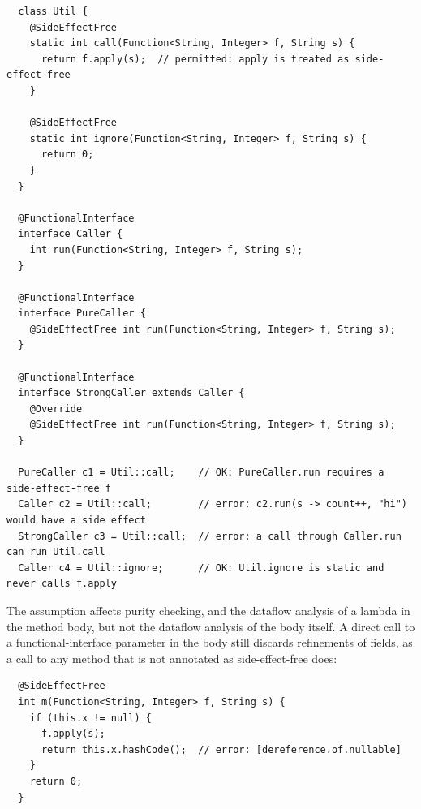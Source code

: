 \begin{Verbatim}
  class Util {
    @SideEffectFree
    static int call(Function<String, Integer> f, String s) {
      return f.apply(s);  // permitted: apply is treated as side-effect-free
    }

    @SideEffectFree
    static int ignore(Function<String, Integer> f, String s) {
      return 0;
    }
  }

  @FunctionalInterface
  interface Caller {
    int run(Function<String, Integer> f, String s);
  }

  @FunctionalInterface
  interface PureCaller {
    @SideEffectFree int run(Function<String, Integer> f, String s);
  }

  @FunctionalInterface
  interface StrongCaller extends Caller {
    @Override
    @SideEffectFree int run(Function<String, Integer> f, String s);
  }

  PureCaller c1 = Util::call;    // OK: PureCaller.run requires a side-effect-free f
  Caller c2 = Util::call;        // error: c2.run(s -> count++, "hi") would have a side effect
  StrongCaller c3 = Util::call;  // error: a call through Caller.run can run Util.call
  Caller c4 = Util::ignore;      // OK: Util.ignore is static and never calls f.apply
\end{Verbatim}

The assumption affects purity checking, and the dataflow analysis of a lambda
in the method body, but not the dataflow analysis of the body itself.  A
direct call to a functional-interface parameter in the body still discards
refinements of fields, as a call to any method that is not annotated as
side-effect-free does:

\begin{Verbatim}
  @SideEffectFree
  int m(Function<String, Integer> f, String s) {
    if (this.x != null) {
      f.apply(s);
      return this.x.hashCode();  // error: [dereference.of.nullable]
    }
    return 0;
  }
\end{Verbatim}

%
%


